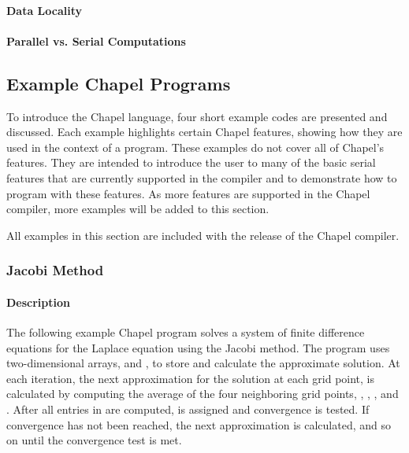 \paragraph{Data Locality}
\paragraph{Parallel vs. Serial Computations}

\subsection{Example Chapel Programs}

To introduce the Chapel language, four short example codes are presented and
discussed.  Each example highlights certain Chapel features, showing how they are used
in the context of a program.  These examples do not cover all of Chapel's features.
They are intended to introduce the user to many of the basic serial features that are
currently supported in the compiler and to demonstrate how to program with 
these features.  As more features are supported in the Chapel compiler, more 
examples will be added to this section.

All examples in this section are included with the release of the Chapel compiler.

\subsubsection{Jacobi Method}

\paragraph{Description}
The following example Chapel program solves a system of finite difference
equations for the Laplace equation using the Jacobi method.  The program uses
two-dimensional arrays,  and , to store and calculate the approximate
solution.  At each iteration, the next approximation for the solution at 
each grid point,  is calculated by computing the average of 
the four neighboring grid points,
, , , and .  
After all entries in  are computed,  is assigned 
and convergence is tested.  If convergence has not been reached, the next
approximation is calculated, and so on until the convergence test is met.

